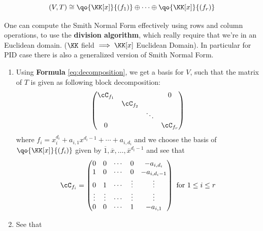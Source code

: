 \begin{note}
	\leavevmode
	\begin{equation}
		\label{eq:decomposition}
		(V,T) \cong \qo{\KK[x]}{(f_1)} \oplus \cdots \oplus \qo{\KK[x]}{(f_r)}
	\end{equation}
\end{note}

\begin{remark}
	One can compute the Smith Normal Form effectively using rows and column operations, to use the
	\textbf{division algorithm}, which really require that we're in an Euclidean domain. (\( \KK \)
	field \( \implies \KK[x] \) Euclidean Domain). In particular for PID case there is also a
	generalized version of Smith Normal Form.
\end{remark}

\begin{conclusion}
	\leavevmode
	\begin{enumerate}
		\item Using \textbf{Formula} \ref{eq:decomposition}, we get a basis for \( V \), such that
		      the matrix of \( T \) is given as following block decomposition:
		      \[
			      \begin{pmatrix}
				      \cC_{f_1} &           &        & 0         \\
				                & \cC_{f_2} &        &           \\
				                &           & \ddots &           \\
				      0         &           &        & \cC_{f_r}
			      \end{pmatrix}
		      \]
		      where \( f_i = x_i^{d_i} + a_{i,1}x^{d_i - 1} + \cdots + a_{i,d_i} \) and we choose the
		      basis of \( \qo{\KK[x]}{(f_i)} \) given by \( \overline{1}, \overline{x},\ldots,
		      \overline{x}^{d_i - 1} \) and see that
		      \[
			      \cC_{f_i} =
			      \begin{pmatrix}
				      0      & 0      & \cdots & 0      & -a_{i,d_i}     \\
				      1      & 0      & \cdots & 0      & -a_{i,d_i - 1} \\
				      0      & 1      & \cdots & \vdots & \vdots         \\
				      \vdots & \vdots & \cdots & \vdots & \vdots         \\
				      0      & 0      & \cdots & 1      & -a_{i,1}
			      \end{pmatrix} \text{ for } 1 \leq i \leq r
		      \]
		\item See that

\end{enumerate}
\end{conclusion}
